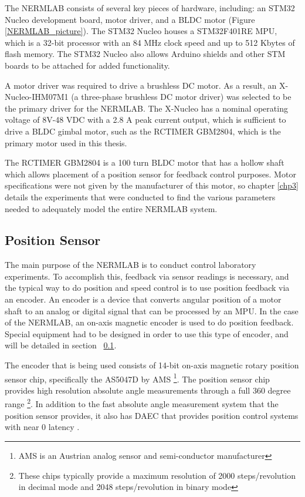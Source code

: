 The NERMLAB consists of several key pieces of hardware, including: an STM32 Nucleo development board, motor driver, and a \ac{BLDC} motor (Figure \ref{NERMLAB_picture}). The STM32 Nucleo houses a STM32F401RE \ac{MPU}, which is a 32-bit processor with an 84 MHz clock speed and up to 512 Kbytes of flash memory. The STM32 Nucleo also allows Arduino shields and other STM boards to be attached for added functionality.  

A motor driver was required to drive a brushless DC motor. As a result, an X-Nucleo-IHM07M1 (a three-phase brushless DC motor driver) was selected to be the primary driver for the NERMLAB. The X-Nucleo has a nominal operating voltage of 8V-48 VDC with a 2.8 A peak current output, which is sufficient to drive a BLDC gimbal motor, such as the RCTIMER GBM2804, which is the primary motor used in this thesis. 

The RCTIMER GBM2804 is a 100 turn BLDC motor that has a hollow shaft which allows placement of a position sensor for feedback control purposes. Motor specifications were not given by the manufacturer of this motor, so chapter \ref{chp3} details the experiments that were conducted to find the various parameters needed to adequately model the entire NERMLAB system.

\subsection{Position Sensor}
\label{makereference2.1.2} 

The main purpose of the NERMLAB is to conduct control laboratory experiments. To accomplish this, feedback via sensor readings is necessary, and the typical way to do position and speed control is to use position feedback via an encoder. An encoder is a device that converts angular position of a motor shaft to an analog or digital signal that can be processed by an MPU. In the case of the NERMLAB, an on-axis magnetic encoder is used to do position feedback. Special equipment had to be designed in order to use this type of encoder, and will be detailed in section ~\ref{makereference2.1.2}.  

The encoder that is being used consists of 14-bit on-axis magnetic rotary position sensor chip, specifically the AS5047D by AMS \footnote{AMS is an Austrian analog sensor and semi-conductor manufacturer}. The position sensor chip provides high resolution absolute angle measurements through a full 360 degree range \footnote{These chips typically provide a maximum resolution of 2000 steps/revolution in decimal mode and 2048 steps/revolution in binary mode}. In addition to the fast absolute angle measurement system that the position sensor provides, it also has \ac{DAEC} that provides position control systems with near 0 latency \citep{1}.  

